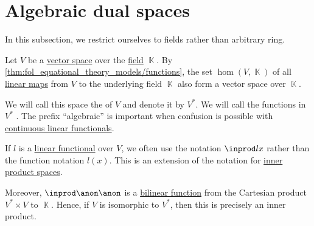 \section{Algebraic dual spaces}\label{sec:algebraic_dual_spaces}

In this subsection, we restrict ourselves to fields rather than arbitrary ring.

\begin{definition}\label{def:dual_vector_space}
  Let \( V \) be a \hyperref[def:vector_space]{vector space} over the \hyperref[def:field]{field} \( \BbbK \). By \cref{thm:fol_equational_theory_models/functions}, the set \( \hom(V, \BbbK) \) of all \hyperref[def:linear_function]{linear maps} from \( V \) to the underlying field \( \BbbK \) also form a vector space over \( \BbbK \).

  We will call this space the  of \( V \) and denote it by \( V^* \). We will call the functions in \( V^* \) . The prefix \enquote{algebraic} is important when confusion is possible with \hyperref[def:continuous_dual_space]{continuous linear functionals}.
\end{definition}

\begin{remark}\label{rem:dual_space_bilinear_form}
  If \( l \) is a \hyperref[def:dual_vector_space]{linear functional} over \( V \), we often use the notation \( \inprod l x \) rather than the function notation \( l(x) \). This is an extension of the notation for \hyperref[def:inner_product_space]{inner product spaces}.

  Moreover, \( \inprod \anon \anon \) is a \hyperref[def:multilinear_function]{bilinear function} from the Cartesian product \( V^* \times V \) to \( \BbbK \). Hence, if \( V \) is isomorphic to \( V^* \), then this is precisely an inner product.
\end{remark}

